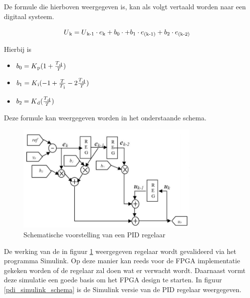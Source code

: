 			\par De formule die hierboven weergegeven is, kan als volgt vertaald worden naar een digitaal systeem.

				\[ U\textsubscript{k} = U\textsubscript{k-1} \cdot e\textsubscript{k} + b\textsubscript{0} \cdot + b\textsubscript{1} \cdot e\textsubscript{(k-1)} + b\textsubscript{2} \cdot e\textsubscript{(k-2)} \]

			\par Hierbij is

				\begin{itemize}
					\item[] $ b\textsubscript{0} = K\textsubscript{p}(1+ \frac{T\textsubscript{d}}{T}) $ \\					
					\item[] $ b\textsubscript{1} = K\textsubscript{i}(-1 +  \frac{T}{T\textsubscript{i}} -2\frac{T\textsubscript{d}}{T} ) $ \\		
					\item[] $ b\textsubscript{2} = K\textsubscript{d}(\frac{T\textsubscript{d}}{T}) $ \\
				\end{itemize}

			\par Deze formule kan weergegeven worden in het onderstaande schema.
	
				\begin{figure}[H]					  
					  \centering
					  \includegraphics[width=0.8\textwidth]{Vooronderzoek/pid_digitaal_schema.png}
					  \caption{Schematische voorstelling van een PID regelaar}
					  \label{pdi_digitaal_schema}
				\end{figure}

			\par De werking van de in figuur \ref{pdi_digitaal_schema} weergegeven regelaar wordt gevalideerd via het programma Simulink. Op deze manier kan reeds voor de FPGA implementatie gekeken worden of de regelaar zal doen wat er verwacht wordt. Daarnaast vormt deze simulatie een goede basis om het FPGA design te starten. In figuur \ref{pdi_simulink_schema} is de Simulink versie van de PID regelaar weergegeven.

